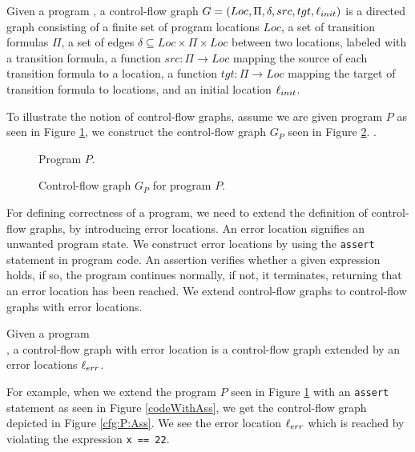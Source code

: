  \begin{mydef}
 	Given a program \prg, a control-flow graph $G = (Loc, \Pi, \delta, src, tgt, \ell_{init})$ is a directed graph consisting of a finite set of program locations $Loc$, a set of transition formulas $\Pi$, a set of edges $\delta \subseteq Loc \times \Pi \times Loc$ between two locations, labeled with a transition formula, a function $src: \Pi \rightarrow Loc$ mapping the source of each transition formula to a location, a function $tgt: \Pi \rightarrow Loc$ mapping the target of transition formula to locations, and an initial location $\ell_{init}$. 
 \end{mydef}
To illustrate the notion of control-flow graphs, assume we are given program $P$ as seen in Figure \ref{codeNoAss}, we construct the control-flow graph $G_P$ seen in Figure \ref{cfg:P:Noass}.
.\begin{center}
	\begin{minipage}[b]{0.4\linewidth}
		\begin{figure}[H]
			\centering
			
			\caption{Program $P$.}
			\label{codeNoAss}
		\end{figure}
	\end{minipage}
	\hfill
	\begin{minipage}[b]{0.59\linewidth}
		\begin{figure}[H]
			\centering
			
			\caption{Control-flow graph $G_P$ for program $P$.}
			\label{cfg:P:Noass}
		\end{figure}
	\end{minipage}
\end{center}
For defining correctness of a program, we need to extend the definition of control-flow graphs, by introducing error locations. An error location signifies an unwanted program state. We construct error locations by using the \texttt{assert} statement in program code. An assertion verifies whether a given expression holds, if so, the program continues normally, if not, it terminates, returning that an error location has been reached. We extend control-flow graphs to control-flow graphs with error locations.
 \begin{mydef}
	Given a program \\ \prg, a control-flow graph with error location \cfg is a control-flow graph extended by an error locations $\ell_{err}$.
\end{mydef}
For example, when we extend the program $P$ seen in Figure \ref{codeNoAss} with an \texttt{assert} statement as seen in Figure \ref{codeWithAss}, we get the control-flow graph depicted in Figure \ref{cfg:P:Ass}. We see the error location $\ell_{err}$ which is reached by violating the expression \texttt{x == 22}.
